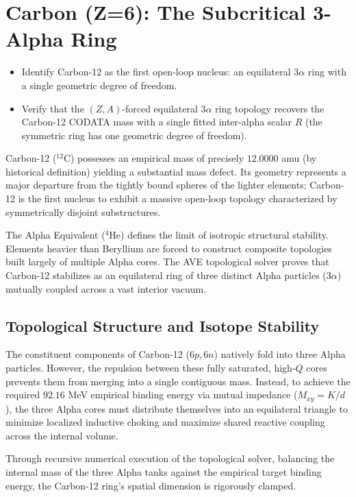 \chapter{Carbon (Z=6): The Subcritical 3-Alpha Ring}


\begin{objectivebox}
\begin{itemize}
    \item Identify Carbon-12 as the first open-loop nucleus: an equilateral $3\alpha$ ring with a single geometric degree of freedom.
    \item Verify that the $(Z,A)$-forced equilateral $3\alpha$ ring topology recovers the Carbon-12 CODATA mass with a single fitted inter-alpha scalar $R$ (the symmetric ring has one geometric degree of freedom).
\end{itemize}
\end{objectivebox}

Carbon-12 ($^{12}\text{C}$) possesses an empirical mass of precisely $12.0000$ amu (by historical definition) yielding a substantial mass defect. Its geometry represents a major departure from the tightly bound spheres of the lighter elements; Carbon-12 is the first nucleus to exhibit a massive open-loop topology characterized by symmetrically disjoint substructures. 

The Alpha Equivalent ($^4\text{He}$) defines the limit of isotropic structural stability. Elements heavier than Beryllium are forced to construct composite topologies built largely of multiple Alpha cores. The AVE topological solver proves that Carbon-12 stabilizes as an equilateral ring of three distinct Alpha particles ($3\alpha$) mutually coupled across a vast interior vacuum.

\section{Topological Structure and Isotope Stability}
The constituent components of Carbon-12 ($6p, 6n$) natively fold into three Alpha particles. However, the repulsion between these fully saturated, high-$Q$ cores prevents them from merging into a single contiguous mass. Instead, to achieve the required $92.16$ MeV empirical binding energy via mutual impedance ($M_{xy} = K / d$), the three Alpha cores must distribute themselves into an equilateral triangle to minimize localized inductive choking and maximize shared reactive coupling across the internal volume.

Through recursive numerical execution of the topological solver, balancing the internal mass of the three Alpha tanks against the empirical target binding energy, the Carbon-12 ring's spatial dimension is rigorously clamped. 

